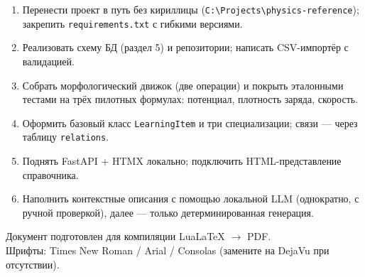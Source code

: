 \documentclass[12pt,a4paper]{article}
\begin{document}
\begin{enumerate}
  \item Перенести проект в путь без кириллицы (\texttt{C:\textbackslash Projects\textbackslash physics-reference}); закрепить \texttt{requirements.txt} с гибкими версиями.
  \item Реализовать схему БД (раздел 5) и репозитории; написать CSV-импортёр с валидацией.
  \item Собрать морфологический движок (две операции) и покрыть эталонными тестами на трёх пилотных формулах: потенциал, плотность заряда, скорость.
  \item Оформить базовый класс \texttt{LearningItem} и три специализации; связи --- через таблицу \texttt{relations}.
  \item Поднять FastAPI + HTMX локально; подключить HTML-представление справочника.
  \item Наполнить контекстные описания с помощью локальной LLM (однократно, с ручной проверкой), далее --- только детерминированная генерация.
\end{enumerate}

\vfill
\begin{center}
\small\color{gray}
Документ подготовлен для компиляции LuaLaTeX $\to$ PDF.\\
Шрифты: Times New Roman / Arial / Consolas (замените на DejaVu при отсутствии).
\end{center}
\end{document}

